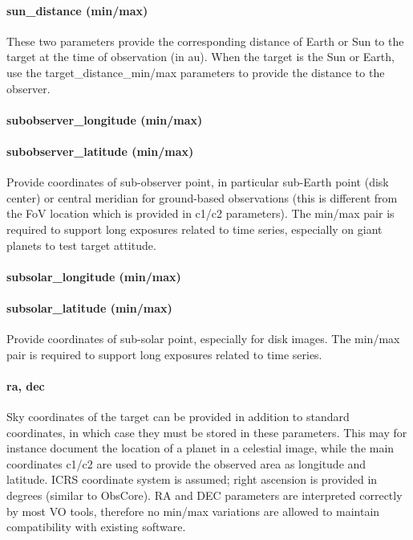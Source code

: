 \documentclass[11pt,a4paper]{ivoa}
\begin{document}
\paragraph{sun\_distance (min/max)}

These two parameters provide the corresponding distance of Earth or Sun
to the target at the time of observation (in au). When the target is the
Sun or Earth, use the target\_distance\_min/max parameters to provide
the distance to the observer.

\paragraph{subobserver\_longitude (min/max)}

\paragraph{subobserver\_latitude (min/max)}

Provide coordinates of sub-observer point, in particular sub-Earth
point (disk center) or central meridian for ground-based observations
(this is different from the FoV location which is provided in c1/c2
parameters). The min/max pair is required to support long exposures
related to time series, especially on giant planets to test target
attitude.

\paragraph{subsolar\_longitude (min/max)}

\paragraph{subsolar\_latitude (min/max)}

Provide coordinates of sub-solar point, especially for disk images.
The min/max pair is required to support long exposures
related to time series.

\paragraph{ra, dec}

Sky coordinates of the target can be provided in addition to standard
coordinates, in which case they must be stored in these parameters.
This may for instance document the location of a planet
in a celestial image,
while the main coordinates c1/c2 are used to provide the observed area as
longitude and latitude. ICRS coordinate system is assumed; right ascension
is provided in degrees (similar to ObsCore). RA and DEC parameters are
interpreted correctly by most VO tools, therefore no min/max variations
are allowed to maintain compatibility with existing software.
\end{document}
